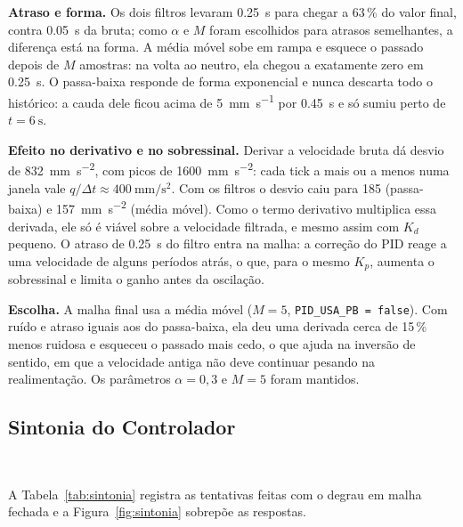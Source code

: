 \documentclass[12pt]{article}
\begin{document}
\textbf{Atraso e forma.} Os dois filtros levaram \SI{0,25}{\second} para chegar a 63\,\% do valor final, contra \SI{0,05}{\second} da bruta; como $\alpha$ e $M$ foram escolhidos para atrasos semelhantes, a diferença está na forma. A média móvel sobe em rampa e esquece o passado depois de $M$ amostras: na volta ao neutro, ela chegou a exatamente zero em \SI{0,25}{\second}. O passa-baixa responde de forma exponencial e nunca descarta todo o histórico: a cauda dele ficou acima de \SI{5}{\milli\meter\per\second} por \SI{0,45}{\second} e só sumiu perto de $t = \SI{6}{\second}$.

\textbf{Efeito no derivativo e no sobressinal.} Derivar a velocidade bruta dá desvio de \SI{832}{\milli\meter\per\second\squared}, com picos de \SI{1600}{\milli\meter\per\second\squared}: cada tick a mais ou a menos numa janela vale $q/\Delta t \approx \SI{400}{\milli\meter\per\second\squared}$. Com os filtros o desvio caiu para 185 (passa-baixa) e \SI{157}{\milli\meter\per\second\squared} (média móvel). Como o termo derivativo multiplica essa derivada, ele só é viável sobre a velocidade filtrada, e mesmo assim com $K_d$ pequeno. O atraso de \SI{0,25}{\second} do filtro entra na malha: a correção do PID reage a uma velocidade de alguns períodos atrás, o que, para o mesmo $K_p$, aumenta o sobressinal e limita o ganho antes da oscilação.

\textbf{Escolha.} A malha final usa a média móvel ($M = 5$, \texttt{PID\_USA\_PB = false}). Com ruído e atraso iguais aos do passa-baixa, ela deu uma derivada cerca de 15\,\% menos ruidosa e esqueceu o passado mais cedo, o que ajuda na inversão de sentido, em que a velocidade antiga não deve continuar pesando na realimentação. Os parâmetros $\alpha = 0{,}3$ e $M = 5$ foram mantidos.

\subsection{Sintonia do Controlador}\

A Tabela~\ref{tab:sintonia} registra as tentativas feitas com o degrau em malha fechada e a Figura~\ref{fig:sintonia} sobrepõe as respostas.
\end{document}
